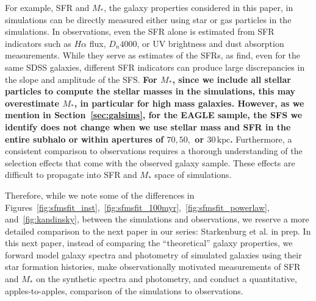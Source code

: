 \documentclass[tighten, preprint]{aastex62}
\begin{document}
For example, SFR and $M_*$, the galaxy properties considered in this paper, 
in simulations can be directly measured either using star or gas particles in 
the simulations. In observations, even the SFR alone is estimated from SFR indicators 
such as $H\alpha$ flux, $D_n 4000$, or UV brightness and dust absorption measurements. 
While they serve as estimates of the SFRs, as \cite{speagle2014} find, even 
for the same SDSS galaxies, different SFR indicators can produce large 
discrepancies in the slope and amplitude of the SFS. 
{\bf \color{red} For $M_*$, since we include all stellar particles to compute 
the stellar masses in the simulations, this may overestimate $M_*$, in 
particular for high mass galaxies. However, as we mention in Section~\ref{sec:galsims}, 
for the EAGLE sample, the SFS we identify does not change when we use stellar 
mass and SFR in the entire subhalo or within apertures of $70, 50,$ or $30\,\mathrm{kpc}$.
}
Furthermore, a 
consistent comparison to observations requires a thorough understanding of 
the selection effects that come with the observed galaxy sample. These 
effects are difficult to propagate into SFR and $M_*$ space of simulations. 


Therefore, while we note some of the differences in 
Figures~\ref{fig:sfmsfit_inst},~\ref{fig:sfmsfit_100myr},~\ref{fig:sfmsfit_powerlaw}, 
and~\ref{fig:kandinsky}, between the simulations and observations,  
we reserve a more detailed comparison to the next paper in our 
series: Starkenburg et al. in prep. In this next paper, instead of
comparing the ``theoretical'' galaxy properties, we forward model galaxy 
spectra and photometry of simulated galaxies using their star formation 
histories, make observationally motivated measurements of SFR and $M_*$ on
the synthetic spectra and photometry, and conduct a quantitative, 
apples-to-apples, comparison of the simulations to observations.
\end{document}
